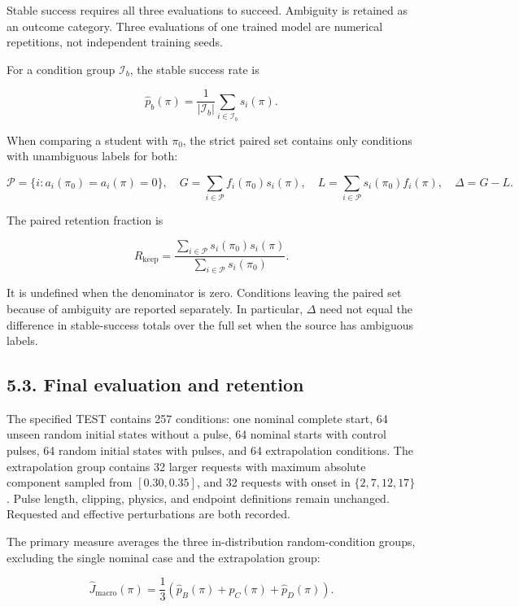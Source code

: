 \documentclass[
  american,
  11pt,
  a4paper,
]{article}
\begin{document}
Stable success requires all three evaluations to succeed. Ambiguity is
retained as an outcome category. Three evaluations of one trained model
are numerical repetitions, not independent training seeds.

For a condition group \(\mathcal I_b\), the stable success rate is

\[
\widehat p_b(\pi)=\frac{1}{|\mathcal I_b|}
\sum_{i\in\mathcal I_b}s_i(\pi).
\tag{35}\label{eq:35}
\]

When comparing a student with \(\pi_0\), the strict paired set contains
only conditions with unambiguous labels for both:

\[
\mathcal P=\{i:a_i(\pi_0)=a_i(\pi)=0\},\quad
G=\sum_{i\in\mathcal P}f_i(\pi_0)s_i(\pi),\quad
L=\sum_{i\in\mathcal P}s_i(\pi_0)f_i(\pi),\quad
\Delta=G-L.
\tag{36}\label{eq:36}
\]

The paired retention fraction is

\[
R_{\mathrm{keep}}=
\frac{\sum_{i\in\mathcal P}s_i(\pi_0)s_i(\pi)}
{\sum_{i\in\mathcal P}s_i(\pi_0)}.
\tag{37}\label{eq:37}
\]

It is undefined when the denominator is zero. Conditions leaving the
paired set because of ambiguity are reported separately. In particular,
\(\Delta\) need not equal the difference in stable-success totals over
the full set when the source has ambiguous labels.

\subsection{5.3. Final evaluation and
retention}\label{final-evaluation-and-retention}

The specified TEST contains 257 conditions: one nominal complete start,
64 unseen random initial states without a pulse, 64 nominal starts with
control pulses, 64 random initial states with pulses, and 64
extrapolation conditions. The extrapolation group contains 32 larger
requests with maximum absolute component sampled from \([0.30,0.35]\),
and 32 requests with onset in \(\{2,7,12,17\}\). Pulse length, clipping,
physics, and endpoint definitions remain unchanged. Requested and
effective perturbations are both recorded.

The primary measure averages the three in-distribution random-condition
groups, excluding the single nominal case and the extrapolation group:

\[
\widehat J_{\mathrm{macro}}(\pi)=
\frac13\left(\widehat p_B(\pi)+\widehat p_C(\pi)+\widehat p_D(\pi)\right).
\tag{38}\label{eq:38}
\]
\end{document}
